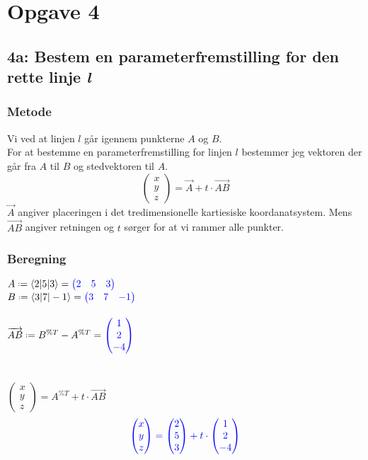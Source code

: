 \documentclass[../main.tex]{subfiles}
\begin{document}
\section*{Opgave 4}
\subsection*{4a: Bestem en parameterfremstilling for den rette linje \textit{l}}
    \subsubsection*{Metode}
        Vi ved at linjen \(l\) går igennem punkterne \(A\) og \(B\).\\
        For at bestemme en parameterfremstilling for linjen \(l\) bestemmer jeg vektoren der går fra \(A\) til \(B\) og stedvektoren til \(A\).\\
        \[\begin{pmatrix} x\\y\\z \end{pmatrix}=\overrightarrow{A}+t\cdot \overrightarrow{AB}\]
        \(\overrightarrow{A}\) angiver placeringen i det tredimensionelle kartiesiske koordanatsystem. Mens \(\overrightarrow{AB}\) angiver retningen og \(t\) sørger for at vi rammer alle punkter.
    \subsubsection*{Beregning}
        \(A \defeq \langle 2|5|3 \rangle = \textcolor{blue}{\begin{pmatrix} 2 & 5 & 3 \end{pmatrix}}\)\\
        \(B \defeq \langle 3|7|-1 \rangle = \textcolor{blue}{\begin{pmatrix} 3 & 7 & -1 \end{pmatrix}}\)\\\\
        \(\overrightarrow{AB} \defeq B^{\%T} - A^{\%T}=\textcolor{blue}{\begin{pmatrix} 1 \\ 2 \\ -4 \end{pmatrix}} \)\\\\\\
        \(\begin{pmatrix} x \\ y \\ z \end{pmatrix}= A^{\%T}+t \cdot \overrightarrow{AB}\)
        \[\textcolor{blue}{\begin{pmatrix} x \\ y \\ z \end{pmatrix}=\begin{pmatrix} 2 \\ 5 \\ 3 \end{pmatrix} + t \cdot \begin{pmatrix} 1 \\ 2 \\ -4 \end{pmatrix}}\]
\end{document}
